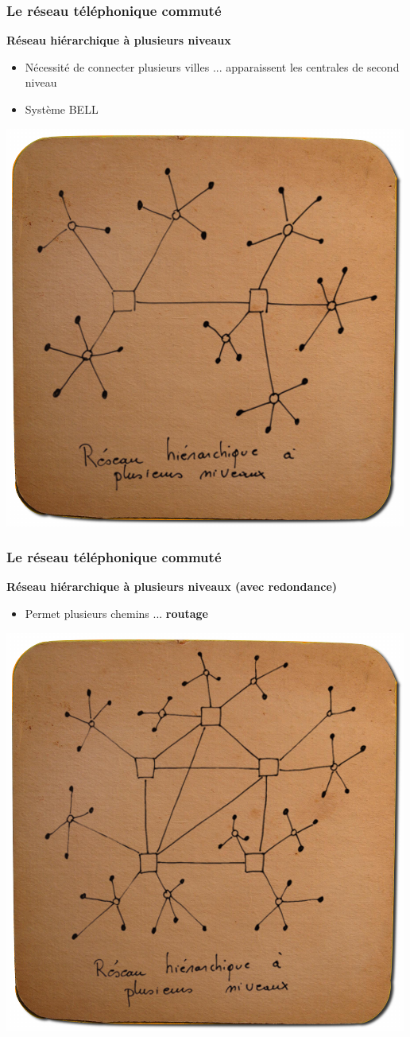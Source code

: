 \begin{frame}[fragile]
  \frametitle{Le réseau téléphonique commuté}
{\large\bf Réseau hiérarchique à plusieurs niveaux}
\begin{itemize}
	\item Nécessité de connecter plusieurs villes ... apparaissent les centrales
	de second niveau
	\item Système BELL
\end{itemize}
\begin{center}
	\includegraphics[width=.5\linewidth]{img/sousbock-rtc-hierarchique.png}
\end{center}
\end{frame}

\begin{frame}[fragile]
  \frametitle{Le réseau téléphonique commuté}
{\large\bf Réseau hiérarchique à plusieurs niveaux (avec redondance)}
\begin{itemize}
	\item Permet plusieurs chemins ... \textbf{routage}
\end{itemize}
\begin{center}
	\includegraphics[width=.54\linewidth]{img/sousbock-rtc-hierarchiqueroutage.png}
\end{center}
\end{frame}

